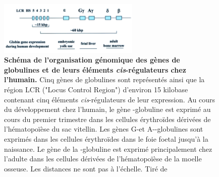 \begin{figure}[h]
 \centering
 \includegraphics[width=0.6\textwidth, page=1]{figures/chap2/chap2-fig2.png}
 \caption[Schéma de l'organisation génomique des gènes de globulines et de leurs éléments \textit{cis}-régulateurs chez l'humain.]{
 \textbf{Schéma de l'organisation génomique des gènes de globulines et de leurs éléments \textit{cis}-régulateurs chez l'humain.}
 Cinq gènes de globulines sont représentés ainsi que la région LCR ("Locus Control Region") d'environ 15 kilobase contenant cinq éléments \textit{cis}-régulateurs de leur expression. Au cours du développement chez l'humain, le gène \textepsilon-globuline est exprimé au cours du premier trimestre dans les cellules érythroïdes dérivées de l'hématopoïèse du sac vitellin. Les gènes G-\textgamma  et A-\textgamma-globulines sont exprimés dans les cellules érythroïdes dans le foie foetal jusqu'à la naissance. Le gène de la \textbeta-globuline est exprimé principalement chez l'adulte dans les cellules dérivées de l'hématopoïèse de la moelle osseuse.
 Les distances ne sont pas à l'échelle. Tiré de \citet{levings_human_2002}\\
 }
 \label{fig:chap2-fig2}
\end{figure} 


